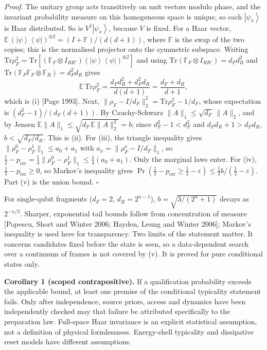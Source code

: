 \documentclass[
  10pt,
  a4paper,
]{article}
\begin{document}
\emph{Proof.} The unitary group acts transitively on unit vectors modulo
phase, and the invariant probability measure on this homogeneous space
is unique, so each \(\left| \psi_x\right\rangle\) is Haar distributed.
So is \(V^\dagger\left| \psi_x\right\rangle\), because \(V\) is fixed.
For a Haar vector,
\(\mathbb E\,(\left| \psi\right\rangle \left\langle \psi\right| )^{\otimes2}=(I+\mathbb F)/(d(d+1))\),
where \(\mathbb F\) is the swap of the two copies; this is the
normalised projector onto the symmetric subspace. Writing
\(\mathrm{Tr}\rho_F^2=\mathrm{Tr}[(\mathbb F_F\otimes I_{RR'})(\left| \psi\right\rangle \left\langle \psi\right| )^{\otimes2}]\)
and using \(\mathrm{Tr}(\mathbb F_F\otimes I_{RR'})=d_Fd_R^2\) and
\(\mathrm{Tr}(\mathbb F_F\mathbb F_F\otimes\mathbb F_R)=d_F^2d_R\) gives
\[\mathbb E\,\mathrm{Tr}\rho_F^2=\frac{d_Fd_R^2+d_F^2d_R}{d(d+1)}=\frac{d_F+d_R}{d+1},\]
which is (i) {[}Page 1993{]}. Next,
\(\|\rho_F-I/d_F\|_2^2=\mathrm{Tr}\rho_F^2-1/d_F\), whose expectation is
\((d_F^2-1)/(d_F(d+1))\). By Cauchy-Schwarz
\(\|A\|_1\le\sqrt{d_F}\,\|A\|_2\), and by Jensen
\(\mathbb E\|A\|_1\le\sqrt{d_F\,\mathbb E\|A\|_2^2}=b\); since
\(d_F^2-1<d_F^2\) and \(d_Fd_R+1>d_Fd_R\), \(b<\sqrt{d_F/d_R}\). This is
(ii). For (iii), the triangle inequality gives
\(\|\rho^0_F-\rho^1_F\|_1\le a_0+a_1\) with
\(a_x=\|\rho^x_F-I/d_F\|_1\), so
\(\tfrac12-p_{\mathrm{err}}=\tfrac14\|\rho^0_F-\rho^1_F\|_1\le\tfrac14(a_0+a_1)\).
Only the marginal laws enter. For (iv),
\(\tfrac12-p_{\mathrm{err}}\ge0\), so Markov's inequality gives
\(\Pr(\tfrac12-p_{\mathrm{err}}\ge\tfrac12-\varepsilon)\le\tfrac12b/(\tfrac12-\varepsilon)\).
Part (v) is the union bound. \(\square\)

For single-qubit fragments (\(d_F=2\), \(d_R=2^{n-1}\)),
\(b=\sqrt{3/(2^n+1)}\) decays as \(2^{-n/2}\). Sharper, exponential tail
bounds follow from concentration of measure {[}Popescu, Short and Winter
2006; Hayden, Leung and Winter 2006{]}; Markov's inequality is used here
for transparency. Two limits of the statement matter. It concerns
candidates fixed before the state is seen, so a data-dependent search
over a continuum of frames is not covered by (v). It is proved for pure
conditional states only.

\textbf{Corollary 1 (scoped contrapositive).} If a qualification
probability exceeds the applicable bound, at least one premise of the
conditional typicality statement fails. Only after independence, source
priors, access and dynamics have been independently checked may that
failure be attributed specifically to the preparation law. Full-space
Haar invariance is an explicit statistical assumption, not a definition
of physical formlessness. Energy-shell typicality and dissipative reset
models have different assumptions.
\end{document}
